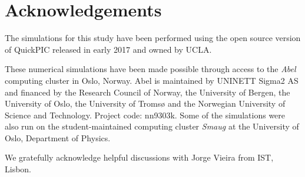\documentclass[aps,prstab,reprint,amsmath,amssymb,groupedaddress]{revtex4-1}
\begin{document}
\section{Acknowledgements}\label{Ack}

The simulations for this study have been performed using the open source version of QuickPIC released in early 2017
and owned by UCLA.

These numerical simulations have been made possible through access to the \emph{Abel} computing cluster in Oslo, Norway.
Abel is maintained by UNINETT Sigma2 AS and financed by the Research Council of Norway, the University of Bergen, the
University of Oslo, the University of Troms{\o} and the Norwegian University of Science and Technology. Project code:
nn9303k. Some of the simulations were also run on the student-maintained computing cluster \emph{Smaug} at the
University of Oslo, Department of Physics.

We gratefully acknowledge helpful discussions with Jorge Vieira from IST, Lisbon.
\vfill


\end{document}
